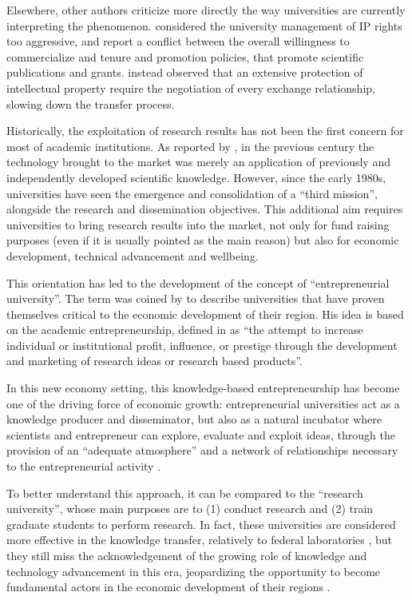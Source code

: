 Elsewhere, other authors criticize more directly the way universities are currently interpreting the phenomenon. \citet{Siegel2003a} considered the university management of IP rights too aggressive, and report a conflict between the overall willingness to commercialize and tenure and promotion policies, that promote scientific publications and grants. \citet{Murray2005} instead observed that an extensive protection of intellectual property require the negotiation of every exchange relationship, slowing down the transfer process.

Historically, the exploitation of research results has not been the first concern for most of academic institutions. As reported by \citet{Balconi2006}, in the previous century the technology brought to the market was merely an application of previously and independently developed scientific knowledge. However, since the early 1980s, universities have seen the emergence and consolidation of a \enquote{third mission}, alongside the research and dissemination objectives. This additional aim requires universities to bring research results into the market, not only for fund raising purposes (even if it is usually pointed as the main reason) but also for economic development, technical advancement and wellbeing. 

This orientation has led to the development of the concept of \enquote{entrepreneurial university}. The term was coined by \citet{Etzkowitz1998} to describe universities that have proven themselves critical to the economic development of their region. His idea is based on the academic entrepreneurship, defined in \citet{Louis1989} as \enquote{the attempt to increase individual or institutional profit, influence, or prestige through the development and marketing of research ideas or research based products}.

In this new economy setting, this knowledge-based entrepreneurship has become one of the driving force of economic growth: entrepreneurial universities act as a knowledge producer and disseminator, but also as a natural incubator where scientists and entrepreneur can explore, evaluate and exploit ideas, through the provision of an \enquote{adequate atmosphere} and a network of relationships necessary to the entrepreneurial activity \citep{Guerrero2014}.

To better understand this approach, it can be compared to the \enquote{research university}, whose main purposes are to (1) conduct research and (2) train graduate students to perform research. In fact, these universities are considered more effective in the knowledge transfer, relatively to federal laboratories \citep{Rogers2001}, but they still miss the acknowledgement of the growing role of knowledge and technology advancement in this era, jeopardizing the opportunity to become fundamental actors in the economic development of their regions \citep{OShea2004}.

